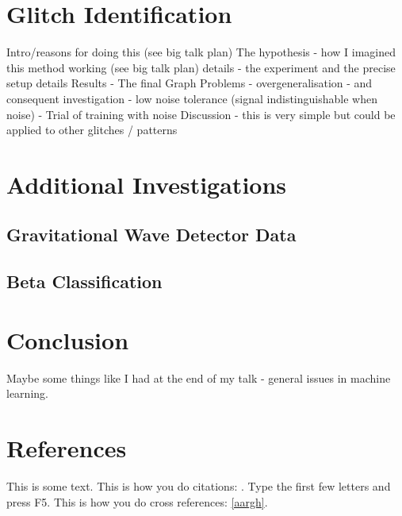 \documentclass[a4paper]{jpconf}
\begin{document}
\section{Glitch Identification}%
Intro/reasons for doing this (see big talk plan)
The hypothesis - how I imagined this method working (see big talk plan)
details - the experiment and the precise setup details
Results - The final Graph
Problems
 - overgeneralisation - and consequent investigation
 - low noise tolerance (signal indistinguishable when noise)
 - Trial of training with noise
Discussion - this is very simple but could be applied to other glitches / patterns

\section{Additional Investigations}%
\subsection{Gravitational Wave Detector Data}
\subsection{Beta Classification}

\section{Conclusion}%
Maybe some things like I had at the end of my talk - general issues in machine learning.

\section*{References} %
This is some text. This is how you do citations: \cite{}. Type the first few letters and press F5.
This is how you do cross references: \ref{aargh}.
\end{document}
